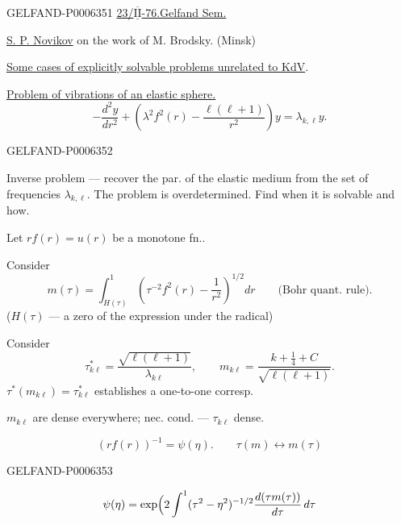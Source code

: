 \begin{GelfandAdjacentEvidence}{GELFAND-P000635}{1}
\underline{23/\(\overline{\underline{\mathrm{II}}}\)-76.}\qquad\underline{Gelfand Sem.}

\underline{S. P. Novikov} on the work of M. Brodsky. (Minsk)

\underline{Some cases of explicitly solvable problems unrelated to KdV}.

\underline{Problem of vibrations of an elastic sphere.}
\[
-\frac{d^2y}{dr^2}+
\left(\lambda^2f^2(r)-\frac{\ell(\ell+1)}{r^2}\right)y
=\lambda_{k,\ell}y.
\]
\end{GelfandAdjacentEvidence}
\begin{GelfandAdjacentEvidence}{GELFAND-P000635}{2}

Inverse problem --- recover the par. of the elastic medium from the set of frequencies \(\lambda_{k,\ell}\).
The problem is overdetermined. Find when it is solvable and how.

Let \(rf(r)=u(r)\) be a monotone fn..

Consider
\[
m(\tau)=\int_{H(\tau)}^1
\left(\tau^{-2}f^2(r)-\frac1{r^2}\right)^{1/2}dr
\qquad\text{(Bohr quant. rule)}.
\]
(\(H(\tau)\) --- a zero of the expression under the radical)

Consider
\[
\tau^*_{k\ell}=\frac{\sqrt{\ell(\ell+1)}}{\lambda_{k\ell}},\qquad
m_{k\ell}=\frac{k+\tfrac14+C}{\sqrt{\ell(\ell+1)}}.
\]
\(\tau^*(m_{k\ell})=\tau^*_{k\ell}\) establishes a one-to-one corresp.

\(m_{k\ell}\) are dense everywhere;
nec. cond. --- \(\tau_{k\ell}\) dense.

\[
(rf(r))^{-1}=\psi(\eta).\qquad \tau(m)\longleftrightarrow m(\tau)
\]
\end{GelfandAdjacentEvidence}
\begin{GelfandAdjacentEvidence}{GELFAND-P000635}{3}

\[
\psi(\eta)=\exp\Bigl(2\int^{1}(\tau^2-\eta^2)^{-1/2}
\frac{d(\tau m(\tau))}{d\tau}\,d\tau
\]
\end{GelfandAdjacentEvidence}
